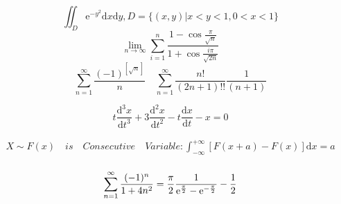 \documentclass{article}
\begin{document}
\begin{displaymath}
    \iint_{D}\mathrm{e}^{-y^{2}}\mathrm{d}x\mathrm{d}y,D = \{(x,y)|x < y < 1,0<x<1\}
\end{displaymath}
\begin{displaymath}
    \lim_{n \to \infty}\sum_{i=1}^{n}\frac{1-\cos\frac{\pi}{\sqrt{n}}}{1+\cos\frac{i\pi}{\sqrt{2n}}}
\end{displaymath}
\begin{displaymath}
    \sum_{n=1 }^\infty \frac{(-1)^{[\sqrt{n}]}}{n} \quad 
    \sum_{n=1}^{\infty} \frac{n!}{(2n+1)!!}\frac{1}{(n+1)} 
\end{displaymath}

\begin{displaymath}
    t\frac{\mathrm{d}^3x}{\mathrm{d}t^3} + 3\frac{\mathrm{d}^2x}{\mathrm{d}t^2}-t\frac{\mathrm{d}x}{\mathrm{d}t}-x = 0
\end{displaymath}

\begin{align*}
    X \sim F(x) \quad is \quad Consecutive \quad Variable : \int_{-\infty}^{+\infty}[F(x+a)-F(x)]\mathrm{d}x = a \\ 
\end{align*}

\begin{displaymath}
    \sum_{n=1}^{\infty} \frac{(-1)^n}{1+4n^2} = \frac{\pi}{2}\frac{1}{\mathrm{e}^{\frac{\pi}{2}}-\mathrm{e}^{-\frac{\pi}{2}}}-\frac{1}{2} \\ 
\end{displaymath}
\end{document}
